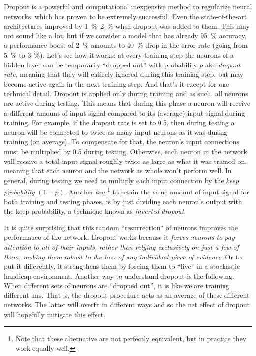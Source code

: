 Dropout \parencite{Hinton2012, Srivastava2014} is a powerful and computational
inexpensive method to regularize neural networks, which has proven to be
extremely successful. Even the state-of-the-art
architectures improved by \SIrange{1}{2}{\percent} when
dropout was added to them. This may not sound like a lot, but if we consider a
model that has already \SI{95}{\percent} accuracy, a performance boost of
\SI{2}{\percent} amounts to \SI{40}{\percent} drop in the error rate (going from
\SI{5}{\percent} to \SI{3}{\percent}). Let's see how it works: at every training
step the neurons of a hidden layer can be temporarily ``dropped out'' with
probability $p$ aka \emph{dropout rate}, meaning that they
will entirely ignored during this training step, but may become active again in
the next training step. And that's it except for one technical detail.  Dropout
is applied only during training and as such, all neurons are active during
testing. This means that during this phase a neuron will receive a different
amount of input signal compared to its (average) input signal during training.
For example, if the dropout rate is set to 0.5, then during testing a neuron will be
connected to twice as many input neurons as it was during training (on average).
To compensate for that, the neuron's input connections must be multiplied by 0.5
during testing.  Otherwise, each neuron in the network will receive a total
input signal roughly twice as large as what it was trained on, meaning that each
neuron and the network as whole won't perform well. In general, during testing
we need to multiply each input connection by the \emph{keep
probability} $(1-p)$. Another way\footnote{Note that
these alternative are not perfectly equivalent, but in practice they work
equally well.} to retain the same amount of input signal for both training and
testing phases, is by just dividing each neuron's output with the keep
probability, a technique known as \emph{inverted dropout}.

It is quite surprising that this random ``resurrection'' of neurons
improves the performance of the network.  Dropout works because it \emph{forces
neurons to pay attention to all of their inputs, rather than relying exclusively
on just a few of them, making them robust to the loss of any individual piece of
evidence}. Or to put it differently, it strengthens them by forcing them to
``live'' in a stochastic handicap environment.  Another way to understand
dropout is the following. When different sets of neurons are ``dropped out'', it
is like we are training different \glspl{nn}. That is, the dropout procedure
acts as an average of these different networks. The latter will overfit in
different ways and so the net effect of dropout will hopefully mitigate this
effect.

